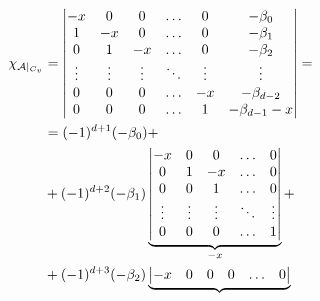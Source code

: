 \documentclass[main]{subfiles}
\begin{document}
\begin{align*}
    \chi_{\mca |_{C_v}} & = \begin{vmatrix}
                                -x     & 0      & 0      & \ldots & 0      & -\beta_0         \\
                                1      & -x     & 0      & \ldots & 0      & -\beta_1         \\
                                0      & 1      & -x     & \ldots & 0      & -\beta_2         \\
                                \vdots & \vdots & \vdots & \ddots & \vdots & \vdots           \\
                                0      & 0      & 0      & \ldots & -x     & -\beta_{d-2}     \\
                                0      & 0      & 0      & \ldots & 1      & -\beta_{d-1} - x \\
                            \end{vmatrix} =                        \\
                        & = (-1)^{d+1} (-\beta_0) +                                                              \\
                        & + (-1)^{d+2} (-\beta_1) \underbrace{\begin{vmatrix}
                                                                      -x     & 0      & 0      & \ldots & 0      \\
                                                                      0      & 1      & -x     & \ldots & 0      \\
                                                                      0      & 0      & 1      & \ldots & 0      \\
                                                                      \vdots & \vdots & \vdots & \ddots & \vdots \\
                                                                      0      & 0      & 0      & \ldots & 1      \\
                                                                  \end{vmatrix}}_{-x} +         \\
                        & + (-1)^{d+3}(-\beta_2) \underbrace{\begin{vmatrix}
                                                                     -x     & 0      & 0      & 0      & \ldots & 0      \\

\end{vmatrix}}
\end{align*}
\end{document}
